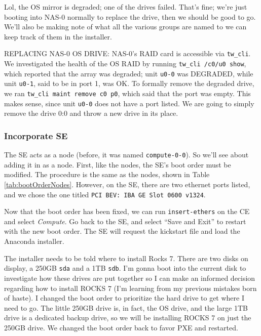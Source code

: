 \documentclass[12pt]{article}
\begin{document}
\qq Lol, the OS mirror is degraded; one of the drives failed. That's fine; we're
just booting into NAS-0 normally to replace the drive, then we should be good to
go. We'll also be making note of what all the various groups are named to we can
keep track of them in the installer.

\qq REPLACING NAS-0 OS DRIVE: NAS-0's RAID card is accessible via {\tt tw\_cli}. 
We investigated the health of the OS RAID by running {\tt tw\_cli /c0/u0 show},
which reported that the array was degraded; unit {\tt u0-0} was DEGRADED, while
unit {\tt u0-1}, said to be in port 1, was OK. To formally remove the degraded
drive, we ran {\tt tw\_cli maint remove c0 p0}, which said that the port was
empty. This makes sense, since unit {\tt u0-0} does not have a port listed. We
are going to simply remove the drive 0:0 and throw a new drive in its place.

\subsubsection{Incorporate SE}

\qq The SE acts as a node (before, it was named {\tt compute-0-0}). So we'll see
about adding it in as a node. First, like the nodes, the SE's boot order must be
modified. The procedure is the same as the nodes, shown in Table
\ref{tab:bootOrderNodes}. However, on the SE, there are two ethernet ports
listed, and we chose the one titled {\tt PCI BEV: IBA GE Slot 0600 v1324}.

\qq Now that the boot order has been fixed, we can run {\tt insert-ethers} on the
CE and select \textit{Compute}. Go back to the SE, and select ``Save and Exit''
to restart with the new boot order. The SE will request the kickstart
file and load the Anaconda installer.

\begin{tcolorbox}[title=ASIDE, colback=white, colframe=blue]
  The installer needs to be told where to install Rocks 7. There are two disks
  on display, a 250GB {\tt sda} and a 1TB {\tt sdb}. I'm gonna boot into the
  current disk to investigate how these drives are put together so I can make an
  informed decision regarding how to install ROCKS 7 (I'm learning from my
  previous mistakes born of haste). I changed the boot order to prioritize the
  hard drive to get where I need to go. The little 250GB drive is, in fact, the OS
  drive, and the large 1TB drive is a dedicated backup drive, so we will be
  installing ROCKS 7 on just the 250GB drive. We changed the boot order back to
  favor PXE and restarted.
\end{tcolorbox}
\end{document}
